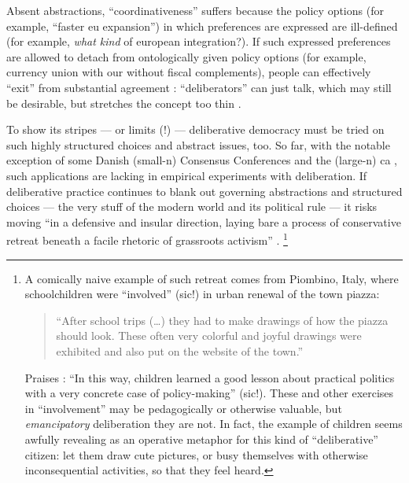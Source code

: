 Absent abstractions, ``coordinativeness'' suffers because the policy options (for example, ``faster \gls{eu} expansion'') in which preferences are expressed \citeyearpar[375]{Landwehr2010} are ill-defined (for example, \emph{what kind} of european integration?).
If such expressed preferences are allowed to detach from ontologically given policy options (for example, currency union with our without fiscal complements), people can effectively ``exit'' from substantial agreement \citep[377]{Landwehr2010}:
``deliberators'' can just talk, which may still be desirable, but stretches the concept too thin \citep[502]{Thompson2008}.

To show its stripes --- or limits (!) --- deliberative democracy must be tried on such highly structured choices and abstract issues, too.
So far, with the notable exception of some Danish (small-n) Consensus Conferences and the (large-n) \gls{ca} \citep[on its complexity,][]{Blais2008}, such applications are lacking in empirical experiments with deliberation.
If deliberative practice continues to blank out governing abstractions and structured choices --- the very stuff of the modern world and its political rule --- it risks moving ``in a defensive and insular direction, laying bare a process of conservative retreat beneath a facile rhetoric of grassroots activism'' \citep[759]{Boggs-1997-aa}.
\footnote{
	A comically naive example of such retreat comes from  Piombino, Italy, where schoolchildren were ``involved'' (sic!) in urban renewal of the town piazza:
	\begin{quote}
		``After school trips (\ldots) they had to make drawings of how the piazza should look.
		These often very colorful and joyful drawings were exhibited and also put on the website of the town.''
	\end{quote}
	Praises \citet[29]{Steiner2012}:
	``In this way, children learned a good lesson about practical politics with a very concrete case of policy-making'' (sic!).
	These and other exercises in ``involvement'' may be pedagogically or otherwise valuable, but \emph{emancipatory} deliberation they are not.
	In fact, the example of children seems awfully revealing as an operative metaphor for this kind of ``deliberative'' citizen:
	let them draw cute pictures, or busy themselves with otherwise inconsequential activities, so that they feel heard.
}

